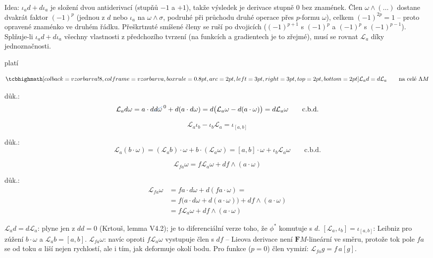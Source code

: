\begin{vysvetleni}
Idea: $\iota_ad+d\iota_a$ je složení dvou antiderivací (stupňů $-1$ a $+1$), takže výsledek je derivace stupně $0$ bez znamének. Člen $\omega\wedge(\dots)$ dostane dvakrát faktor $(-1)^p$ (jednou z $d$ nebo $\iota_a$ na $\omega\wedge\sigma$, podruhé při průchodu druhé operace přes $p$-formu $\omega$), celkem $(-1)^{2p}=1$ -- proto opravené znaménko ve druhém řádku. Přeškrtnuté smíšené členy se ruší po dvojicích ($(-1)^{p+1}$ s $(-1)^p$ a $(-1)^p$ s $(-1)^{p-1}$).
Splňuje-li $\iota_ad+d\iota_a$ všechny vlastnosti z předchozího tvrzení (na funkcích a gradientech je to zřejmé), musí se rovnat $\mathcal{L}_a$ díky jednoznačnosti.
\end{vysvetleni}

platí

\begin{veta}[Tvrzení]
\[
  \vzorec{\mathcal{L}_a d = d\mathcal{L}_a} \qquad\text{na celé } \Lambda M
\]
\end{veta}
důk.:
\[
  \mathcal{L}_ad\omega = a\cdot d\gmIsestBskrt{d\omega}^{\,0} + d(a\cdot d\omega)
  = d\big(\mathcal{L}_a\omega - d(a\cdot\omega)\big) = d\mathcal{L}_a\omega \qquad\text{c.b.d.}
\]

\begin{veta}[Tvrzení]
\[
  \mathcal{L}_a\iota_b - \iota_b\mathcal{L}_a = \iota_{[a,b]}
\]
\end{veta}
důk.:
\[
  \mathcal{L}_a(b\cdot\omega) = (\mathcal{L}_ab)\cdot\omega + b\cdot(\mathcal{L}_a\omega)
  = [a,b]\cdot\omega + \iota_b\mathcal{L}_a\omega \qquad\text{c.b.d.}
\]

\begin{veta}[Tvrzení]
\[
  \mathcal{L}_{fa}\omega = f\mathcal{L}_a\omega + df\wedge(a\cdot\omega)
\]
\end{veta}
důk.:
\begin{align*}
  \mathcal{L}_{fa}\omega &= fa\cdot d\omega + d(fa\cdot\omega) = \\
  &= f\big(a\cdot d\omega + d(a\cdot\omega)\big) + df\wedge(a\cdot\omega) \\
  &= f\mathcal{L}_a\omega + df\wedge(a\cdot\omega)
\end{align*}

\begin{vysvetleni}
$\mathcal{L}_ad=d\mathcal{L}_a$: plyne jen z $dd=0$ (Krtouš, lemma V4.2); je to diferenciální verze toho, že $\phi^*$ komutuje s $d$.
$[\mathcal{L}_a,\iota_b]=\iota_{[a,b]}$: Leibniz pro zúžení $b\cdot\omega$ a $\mathcal{L}_ab=[a,b]$.
$\mathcal{L}_{fa}\omega$: navíc oproti $f\mathcal{L}_a\omega$ vystupuje člen s $df$ -- Lieova derivace není $\mathbf{F}M$-lineární ve směru, protože tok pole $fa$ se od toku $a$ liší nejen rychlostí, ale i tím, jak deformuje okolí bodu. Pro funkce ($p=0$) člen vymizí: $\mathcal{L}_{fa}g=f\,a[g]$.
\end{vysvetleni}

